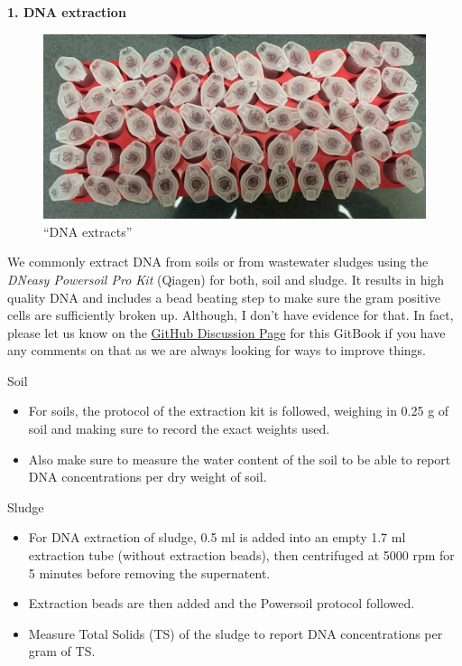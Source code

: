 \documentclass[
]{book}
\providecommand{\tightlist}{%
  \setlength{\itemsep}{0pt}\setlength{\parskip}{0pt}}
\begin{document}
\textbf{1. DNA extraction}

\begin{figure}
\centering
\includegraphics{./img/dna.jpeg}
\caption{``DNA extracts''}
\end{figure}

We commonly extract DNA from soils or from wastewater sludges using the \emph{DNeasy Powersoil Pro Kit} (Qiagen) for both, soil and sludge. It results in high quality DNA and includes a bead beating step to make sure the gram positive cells are sufficiently broken up. Although, I don't have evidence for that. In fact, please let us know on the \href{https://github.com/chrismitbiz/ABlab-workflows/discussions}{GitHub Discussion Page} for this GitBook if you have any comments on that as we are always looking for ways to improve things.

Soil

\begin{itemize}
\tightlist
\item
  For soils, the protocol of the extraction kit is followed, weighing in 0.25 g of soil and making sure to record the exact weights used.\\
\item
  Also make sure to measure the water content of the soil to be able to report DNA concentrations per dry weight of soil.
\end{itemize}

Sludge

\begin{itemize}
\tightlist
\item
  For DNA extraction of sludge, 0.5 ml is added into an empty 1.7 ml extraction tube (without extraction beads), then centrifuged at 5000 rpm for 5 minutes before removing the supernatent.
\item
  Extraction beads are then added and the Powersoil protocol followed.
\item
  Measure Total Solids (TS) of the sludge to report DNA concentrations per gram of TS.\\
  \strut \\
\end{itemize}
\end{document}
